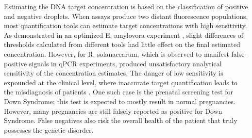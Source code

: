 Estimating the DNA target concentration is based on the classification of positive and negative droplets. When assays produce two distant fluorescence populations, most quantification tools can estimate target concentrations with high sensitivity. As demonstrated in an optimized E. amylovora experiment \cite{Dreo2014}, slight differences of thresholds calculated from different tools had little effect on the final estimated concentration. However, for R. solanacearum, which is observed to manifest false-positive signals in qPCR experiments, produced unsatisfactory analytical sensitivity of the concentration estimates. The danger of low sensitivity is expounded at the clinical level, where inaccurate target quantification leads to the misdiagnosis of patients \cite{Tzonev2018}. One such case is the prenatal screening test for Down Syndrome; this test is expected to mostly result in normal pregnancies. However, many pregnancies are still falsely reported as positive for Down Syndrome. False negatives also risk the overall health of the patient that truly possesses the genetic disorder.


